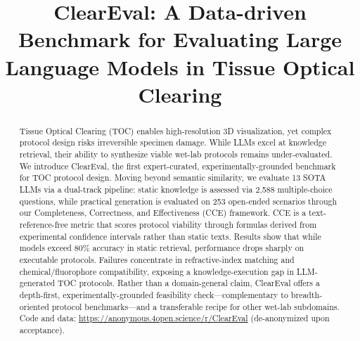 \documentclass[conference]{IEEEtran}
\begin{document}
\title{ClearEval: A Data-driven Benchmark for Evaluating Large Language
Models in Tissue Optical Clearing}

\author{
}


\maketitle

\begin{abstract}
Tissue Optical Clearing (TOC) enables high-resolution 3D visualization, yet
complex protocol design risks irreversible specimen damage. While LLMs excel
at knowledge retrieval, their ability to synthesize viable wet-lab protocols
remains under-evaluated. We introduce ClearEval, the first expert-curated,
experimentally-grounded benchmark for TOC protocol design. Moving beyond
semantic similarity, we evaluate 13 SOTA LLMs via a dual-track pipeline: static
knowledge is assessed via 2{,}588 multiple-choice questions, while practical
generation is evaluated on 253 open-ended scenarios through our Completeness,
Correctness, and Effectiveness (CCE) framework. CCE is a text-reference-free
metric that scores protocol viability through formulas derived from
experimental confidence intervals rather than static texts. Results show that
while models exceed 80\% accuracy in static retrieval, performance drops
sharply on executable protocols. Failures concentrate in refractive-index
matching and chemical/fluorophore compatibility, exposing a knowledge-execution
gap in LLM-generated TOC protocols. Rather than a domain-general claim,
ClearEval offers a depth-first, experimentally-grounded feasibility
check---complementary to breadth-oriented protocol benchmarks---and a
transferable recipe for other wet-lab subdomains. Code and data:
\url{https://anonymous.4open.science/r/ClearEval} (de-anonymized upon
acceptance).
\end{abstract}
\end{document}
